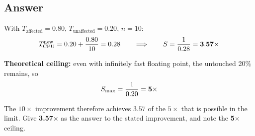 \subsection*{Answer}

\begin{answerbox}
With $T_{\text{affected}} = 0.80$, $T_{\text{unaffected}} = 0.20$, $n = 10$:
$$T_{\mathrm{CPU}}^{\text{new}} = 0.20 + \frac{0.80}{10} = 0.28
\qquad\Longrightarrow\qquad
S = \frac{1}{0.28} = \mathbf{3.57\times}$$

\medskip
\textbf{Theoretical ceiling:} even with infinitely fast floating point, the
untouched 20\% remains, so
$$S_{\max} = \frac{1}{0.20} = \mathbf{5\times}$$

\medskip
{\small The $10\times$ improvement therefore achieves $3.57$ of the $5\times$
that is possible in the limit. Give \textbf{3.57$\times$} as the answer to the
stated improvement, and note the \textbf{5$\times$} ceiling.}
\end{answerbox}


